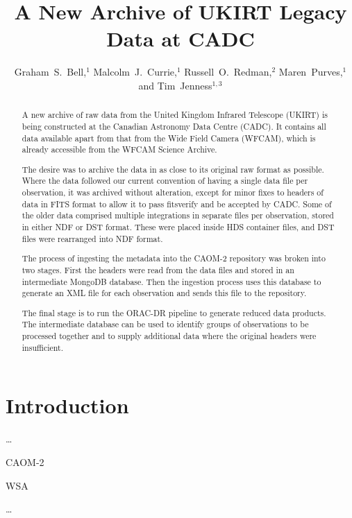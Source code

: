 \documentclass[11pt,twoside]{article}
\begin{document}
\title{A New Archive of UKIRT Legacy Data at CADC}
\author{Graham~S.~Bell,$^1$ Malcolm~J.~Currie,$^1$ Russell~O.~Redman,$^2$ Maren~Purves,$^1$ and Tim~Jenness$^{1,3}$
}

\begin{abstract}
A new archive of raw data from the United Kingdom Infrared
Telescope (UKIRT) is being constructed at the Canadian Astronomy
Data Centre (CADC).  It contains all data available apart from
that from the Wide Field Camera (WFCAM), which is already
accessible from the WFCAM Science Archive.

The desire was to archive the data in as close to its original raw
format as possible.  Where the data followed our current convention
of having a single data file per observation, it was archived
without alteration, except for minor fixes to headers of data in
FITS format to allow it to pass fitsverify and be accepted by CADC.
Some of the older data comprised multiple integrations in separate
files per observation, stored in either NDF or DST format. These
were placed inside HDS container files, and DST files were rearranged
into NDF format.

The process of ingesting the metadata into the CAOM-2 repository
was broken into two stages.  First the headers were read from
the data files and stored in an intermediate MongoDB database.
Then the ingestion process uses this database to generate an XML
file for each observation and sends this file to the repository.

The final stage is to run the ORAC-DR pipeline to generate reduced
data products.  The intermediate database can be used to identify
groups of observations to be processed together and to supply
additional data where the original headers were insufficient.
\end{abstract}

\section{Introduction}

\ldots

CAOM-2 \citep{2012ASPC..461..339D}

WSA \citep{2008MNRAS.384..637H}

\ldots
\end{document}
